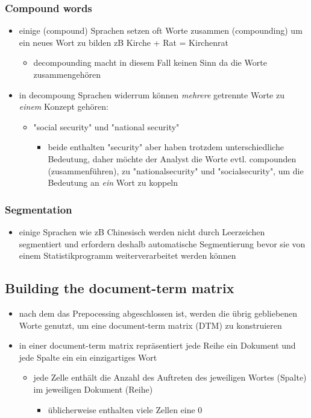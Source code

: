\documentclass[11pt]{article}
\begin{document}
\subsubsection{Compound words}
\label{sec:org7f664f1}
\begin{itemize}
\item einige (compound) Sprachen setzen oft Worte zusammen (compounding) um ein neues Wort zu bilden zB Kirche + Rat = Kirchenrat
\begin{itemize}
\item decompounding macht in diesem Fall keinen Sinn da die Worte zusammengehören
\end{itemize}
\item in decompoung Sprachen widerrum können \emph{mehrere} getrennte Worte zu \emph{einem} Konzept gehören:
\begin{itemize}
\item "social security" und "national security"
\begin{itemize}
\item beide enthalten "security" aber haben trotzdem unterschiedliche Bedeutung, daher möchte der Analyst die Worte evtl. compounden (zusammenführen), zu "nationalsecurity" und "socialsecurity", um die Bedeutung an \emph{ein} Wort zu koppeln
\end{itemize}
\end{itemize}
\end{itemize}

\subsubsection{Segmentation}
\label{sec:org2c931d1}
\begin{itemize}
\item einige Sprachen wie zB Chinesisch werden nicht durch Leerzeichen segmentiert und erfordern deshalb automatische Segmentierung bevor sie von einem Statistikprogramm weiterverarbeitet werden können
\end{itemize}

\subsection{Building the document-term matrix}
\label{sec:orgdb0fe54}
\begin{itemize}
\item nach dem das Prepocessing abgeschlossen ist, werden die übrig gebliebenen Worte genutzt, um eine document-term matrix (DTM) zu konstruieren
\item in einer document-term matrix repräsentiert jede Reihe ein Dokument und jede Spalte ein ein einzigartiges Wort
\begin{itemize}
\item jede Zelle enthält die Anzahl des Auftreten des jeweiligen Wortes (Spalte) im jeweiligen Dokument (Reihe)
\begin{itemize}
\item üblicherweise enthalten viele Zellen eine 0
\end{itemize}
\end{itemize}
\end{itemize}
\end{document}
